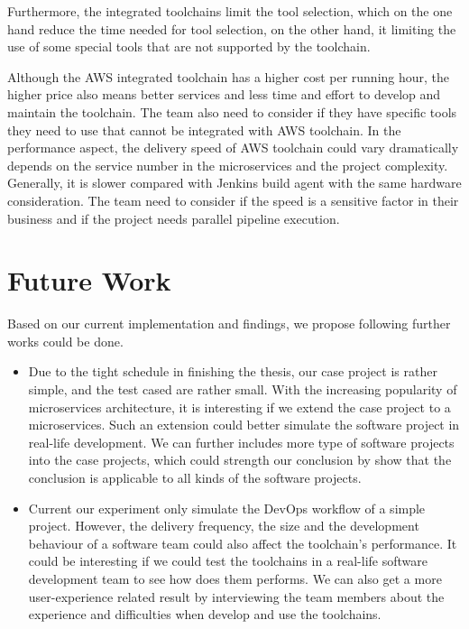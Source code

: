 Furthermore, the integrated toolchains limit the tool selection, which on the one hand reduce the time needed for tool selection, on the other hand, it limiting the use of some special tools that are not supported by the toolchain.
\par
Although the AWS integrated toolchain has a higher cost per running hour, the higher price also means better services and less time and effort to develop and maintain the toolchain. The team also need to consider if they have specific tools they need to use that cannot be integrated with AWS toolchain. In the performance aspect, the delivery speed of AWS toolchain could vary dramatically depends on the service number in the microservices and the project complexity. Generally, it is slower compared with Jenkins build agent with the same hardware consideration. The team need to consider if the speed is a sensitive factor in their business and if the project needs parallel pipeline execution.
\section{Future Work}
Based on our current implementation and findings, we propose following further works could be done.
\begin{itemize}
    \item Due to the tight schedule in finishing the thesis, our case project is rather simple, and the test cased are rather small.  With the increasing popularity of microservices architecture, it is interesting if we extend the case project to a microservices. Such an extension could better simulate the software project in real-life development. We can further includes more type of software projects into the case projects, which could strength our conclusion by show that the conclusion is applicable to all kinds of the software projects.
    \item Current our experiment only simulate the DevOps workflow of a simple project. However, the delivery frequency, the size and the development behaviour of a software team could also affect the toolchain's performance. It could be interesting if we could test the toolchains in a real-life software development team to see how does them performs. We can also get a more user-experience related result by interviewing the team members about the experience and difficulties when develop and use the toolchains.
\end{itemize}

